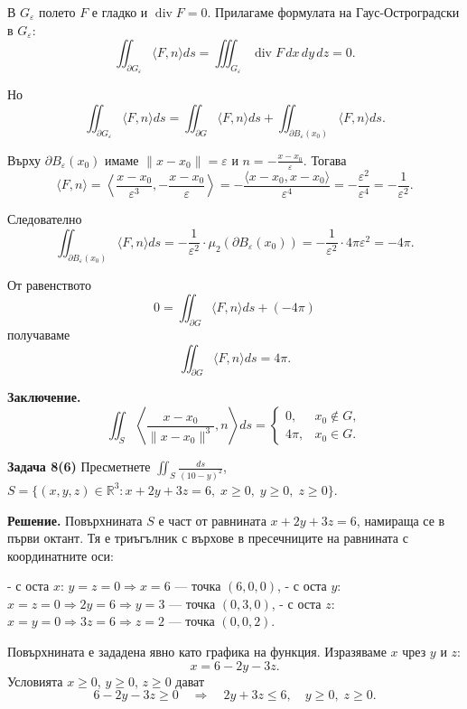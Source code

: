 \documentclass[10pt]{article}
\begin{document}
В $G_\varepsilon$ полето $F$ е гладко и $\operatorname{div} F = 0$. Прилагаме формулата на Гаус-Остроградски в $G_\varepsilon$:
\[
\iint_{\partial G_\varepsilon} \langle F, n \rangle ds = \iiint_{G_\varepsilon} \operatorname{div} F \,dx\,dy\,dz = 0.
\]

Но
\[
\iint_{\partial G_\varepsilon} \langle F, n \rangle ds = \iint_{\partial G} \langle F, n \rangle ds + \iint_{\partial B_\varepsilon(x_0)} \langle F, n \rangle ds.
\]

Върху $\partial B_\varepsilon(x_0)$ имаме $\|x - x_0\| = \varepsilon$ и $n = -\frac{x - x_0}{\varepsilon}$. Тогава
\[
\langle F, n \rangle = \left\langle \frac{x - x_0}{\varepsilon^3}, -\frac{x - x_0}{\varepsilon} \right\rangle = -\frac{\langle x - x_0, x - x_0 \rangle}{\varepsilon^4} = -\frac{\varepsilon^2}{\varepsilon^4} = -\frac{1}{\varepsilon^2}.
\]

Следователно
\[
\iint_{\partial B_\varepsilon(x_0)} \langle F, n \rangle ds = -\frac{1}{\varepsilon^2} \cdot \mu_2(\partial B_\varepsilon(x_0)) = -\frac{1}{\varepsilon^2} \cdot 4\pi\varepsilon^2 = -4\pi.
\]

От равенството
\[
0 = \iint_{\partial G} \langle F, n \rangle ds + (-4\pi)
\]
получаваме
\[
\iint_{\partial G} \langle F, n \rangle ds = 4\pi.
\]

\textbf{Заключение.} 
\[
\boxed{\iint_S \left\langle \frac{x - x_0}{\|x - x_0\|^3}, n \right\rangle ds = \begin{cases}
0, & x_0 \notin G, \\[4pt]
4\pi, & x_0 \in G.
\end{cases}}
\]


\textbf{Задача 8(6) }Пресметнете $\iint_S \frac{ds}{(10-y)^2}$, $S = \{(x,y,z)\in\mathbb{R}^3 : x+2y+3z=6,\; x\ge0,\; y\ge0,\; z\ge0\}$.

\textbf{Решение.} 
Повърхнината $S$ е част от равнината $x + 2y + 3z = 6$, намираща се в първи октант. Тя е триъгълник с върхове в пресечниците на равнината с координатните оси:

- с оста $x$: $y = z = 0 \Rightarrow x = 6$ — точка $(6,0,0)$,
- с оста $y$: $x = z = 0 \Rightarrow 2y = 6 \Rightarrow y = 3$ — точка $(0,3,0)$,
- с оста $z$: $x = y = 0 \Rightarrow 3z = 6 \Rightarrow z = 2$ — точка $(0,0,2)$.

Повърхнината е зададена явно като графика на функция. Изразяваме $x$ чрез $y$ и $z$:
\[
x = 6 - 2y - 3z.
\]
Условията $x \ge 0$, $y \ge 0$, $z \ge 0$ дават
\[
6 - 2y - 3z \ge 0 \quad \Longrightarrow \quad 2y + 3z \le 6,\quad y \ge 0,\; z \ge 0.
\]
\end{document}
